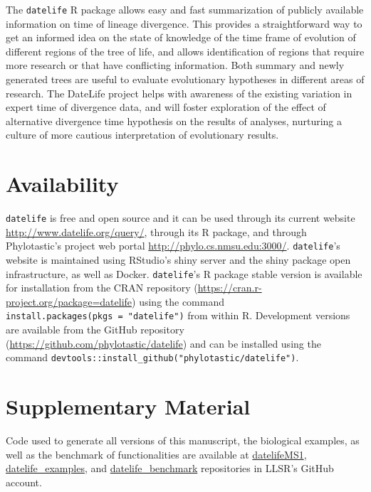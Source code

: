 \documentclass[
  english,
  man]{apa6}
\begin{document}
The \texttt{datelife} R package allows easy and fast summarization of publicly available information
on time of lineage divergence. This provides a straightforward way to get an informed idea on the state of knowledge of the time frame of evolution of different regions of the tree of life, and allows identification of regions that require more research or that have conflicting information.
Both summary and newly generated trees are useful to evaluate evolutionary hypotheses in different areas of research. The DateLife project helps with awareness of the existing variation in expert time of divergence data, and will foster exploration of the effect of alternative divergence time hypothesis on the results of analyses, nurturing a culture of more cautious interpretation of evolutionary results.

\hypertarget{availability}{%
\section{Availability}\label{availability}}

\texttt{datelife} is free and open source and it can be used through its current website
\url{http://www.datelife.org/query/}, through its R package, and through Phylotastic's project web portal \url{http://phylo.cs.nmsu.edu:3000/}.
\texttt{datelife}'s website is maintained using RStudio's shiny server and the shiny package open infrastructure, as well as Docker.
\texttt{datelife}'s R package stable version is available
for installation from the CRAN repository (\url{https://cran.r-project.org/package=datelife})
using the command \texttt{install.packages(pkgs\ =\ "datelife")} from within R. Development versions
are available from the GitHub repository (\url{https://github.com/phylotastic/datelife})
and can be installed using the command \texttt{devtools::install\_github("phylotastic/datelife")}.

\hypertarget{supplementary-material}{%
\section{Supplementary Material}\label{supplementary-material}}

Code used to generate all versions of this manuscript, the biological examples, as well as the benchmark of functionalities are available at \href{https://github.com/LunaSare/datelifeMS1}{datelifeMS1}, \href{https://github.com/LunaSare/datelife_examples}{datelife\_examples}, and \href{https://github.com/LunaSare/datelife_benchmark}{datelife\_benchmark} repositories in LLSR's GitHub account.
\end{document}
